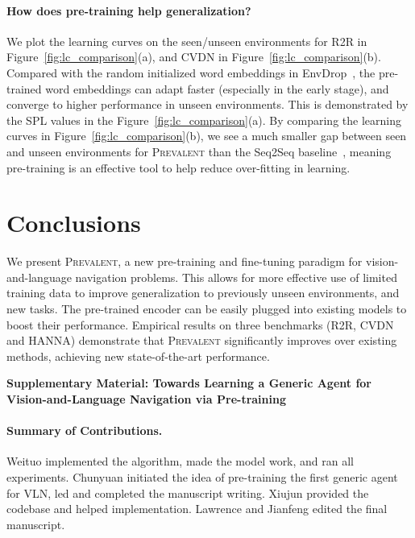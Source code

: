 \documentclass[10pt,twocolumn,letterpaper]{article}
\newcommand{\short}{\textsc{Prevalent}}
\begin{document}
\paragraph{How does pre-training help generalization?} We plot the learning curves on the seen/unseen environments for R2R in Figure~\ref{fig:lc_comparison}(a), and CVDN in Figure~\ref{fig:lc_comparison}(b). 
Compared with the random initialized word embeddings in EnvDrop~\cite{tan2019learning}, the pre-trained word embeddings can adapt faster (especially in the early stage), and converge to higher performance in unseen environments. This is demonstrated by the SPL values in the Figure~\ref{fig:lc_comparison}(a).
By comparing the learning curves in Figure~\ref{fig:lc_comparison}(b), we see a much smaller gap between seen and unseen environments for \short{} than the Seq2Seq baseline~\cite{thomason2019vision}, meaning pre-training is an effective tool to help reduce over-fitting in learning.

\section{Conclusions}
We present \short{}, a new pre-training and fine-tuning paradigm for vision-and-language navigation problems. This allows for more effective use of limited training data to improve generalization to previously unseen environments, and new tasks. The pre-trained encoder can be easily plugged into existing models to boost their performance. Empirical results on three benchmarks (R2R, CVDN and HANNA) demonstrate that \short{} significantly improves over existing methods, achieving new state-of-the-art performance.


\newpage

{\small


}


\onecolumn
\appendix
\newpage


\begin{center}
	\bf{\Large Supplementary Material: Towards Learning a Generic Agent for \\ Vision-and-Language Navigation via Pre-training} \\ 
	\vspace{5mm}
\end{center}

\paragraph{Summary of Contributions.} Weituo implemented the algorithm, made the model work, and ran all experiments. Chunyuan initiated the idea of pre-training the first generic agent for VLN, led and completed the manuscript writing. Xiujun provided the codebase and helped implementation. Lawrence and Jianfeng edited the final manuscript.
\end{document}
